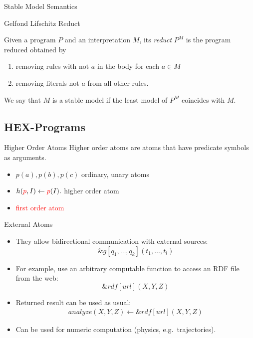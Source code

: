 \documentclass[smaller, dvipsnames]{beamer}
\begin{document}
\begin{frame}{Stable Model Semantics}
	\begin{center} {\large{Gelfond Lifschitz Reduct}} \end{center}
	Given a program \(P\) and an interpretation \(M\), its \emph{reduct} \(P^M\) is the program reduced obtained by 
	\begin{enumerate}
		\item removing rules with \(\text{not } a\) in the body for each \(a \in M\)
		\item removing literals \(\text{not } a\) from all other rules.
	\end{enumerate}	  
	We say that \(M\) is a stable model if the least model of \(P^M\) coincides with \(M\).
\end{frame}

\subsection{HEX-Programs}

\begin{frame}{Higher Order Atoms}
	Higher order atoms are atoms that have predicate symbols as arguments.
	\begin{itemize}
		\item<1->[] \(p(a),p(b),p(c)\) \quad \quad \quad \quad \quad ordinary, unary atoms
		\item<2->[] \(h(\textcolor{red}{p},I) \leftarrow \textcolor{red}{p}(I).\) \quad \quad \quad \quad \quad higher order atom
		\item<2->[] \textcolor{red}{first order atom}
	\end{itemize}
\end{frame}

\begin{frame}{External Atoms}
    \begin{itemize}[<+->]
    	\item They allow bidirectional communication with external sources: \[ \&g[q_1,\dots,q_k](t_1,\dots,t_l) \]
    	\item For example, use an arbitrary computable function to access an RDF file from the web: \[ \&rdf[url](X,Y,Z) \]
    	\item Returned result can be used as usual:
    		\begin{align*}
				analyze(X,Y,Z) \leftarrow \&rdf[url](X,Y,Z)
    		\end{align*}
    	\item Can be used for numeric computation (physics, e.g.~trajectories).
    \end{itemize}
\end{frame}
\end{document}
